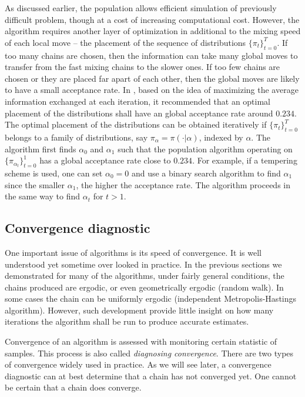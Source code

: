 As discussed earlier, the population \mcmc allows efficient simulation of
previously difficult problem, though at a cost of increasing computational
cost. However, the algorithm requires another layer of optimization in
additional to the mixing speed of each local move -- the placement of the
sequence of distributions $\{\pi_t\}_{t=0}^T$. If too many chains are chosen,
then the information can take many global moves to transfer from the fast
mixing chains to the slower ones. If too few chains are chosen or they are
placed far apart of each other, then the global moves are likely to have a
small acceptance rate. In \cite{Atchade:2010ha}, based on the idea of
maximizing the average information exchanged at each iteration, it recommended
that an optimal placement of the distributions shall have an global acceptance
rate around $0.234$. The optimal placement of the distributions can be
obtained iteratively if $\{\pi_t\}_{t=0}^T$ belongs to a family of
distributions, say $\pi_{\alpha} = \pi(\cdot|\alpha)$, indexed by $\alpha$.
The algorithm first finds $\alpha_0$ and $\alpha_1$ such that the population
\mcmc algorithm operating on $\{\pi_{\alpha_t}\}_{t=0}^1$ has a global
acceptance rate close to $0.234$.  For example, if a tempering scheme is used,
one can set $\alpha_0 = 0$ and use a binary search algorithm to find
$\alpha_1$ since the smaller $\alpha_1$, the higher the acceptance rate. The
algorithm proceeds in the same way to find $\alpha_t$ for $t>1$.

\subsection{Convergence diagnostic}
\label{sub:Convergence diagnostic}

One important issue of \mcmc algorithms is its speed of convergence. It is
well understood yet sometime over looked in practice. In the previous
sections we demonstrated for many of the algorithms, under fairly general
conditions, the chains produced are ergodic, or even geometrically ergodic
(random walk). In some cases the chain can be uniformly ergodic (independent
Metropolis-Hastings algorithm). However, such development provide little
insight on how many iterations the algorithm shall be run to produce accurate
estimates.

Convergence of an \mcmc algorithm is assessed with monitoring certain
statistic of samples. This process is also called \emph{diagnosing
  convergence}. There are two types of convergence
\cite[][chap.~12]{Robert:2004tn} widely used in practice. As we will see
later, a convergence diagnostic can at best determine that a chain has not
converged yet. One cannot be certain that a chain does converge.

